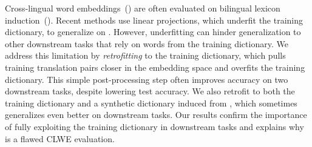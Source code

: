 
Cross-lingual word embeddings~() are often evaluated on bilingual
lexicon induction~().
Recent  methods use linear projections, which underfit the training
dictionary, to generalize on .
However, underfitting can hinder generalization to other downstream tasks that 
rely on words from the training dictionary.
We address this limitation by \emph{retrofitting}  to the training
dictionary, which pulls training translation pairs closer in the
embedding space and overfits the training dictionary.
This simple post-processing step often improves accuracy on two downstream
tasks, despite lowering  test accuracy.
We also retrofit to both the training dictionary and a
synthetic dictionary induced from , which sometimes generalizes
even better on downstream tasks.
Our results confirm the importance of fully exploiting the training dictionary
in downstream tasks and explains why  is a flawed CLWE evaluation.
